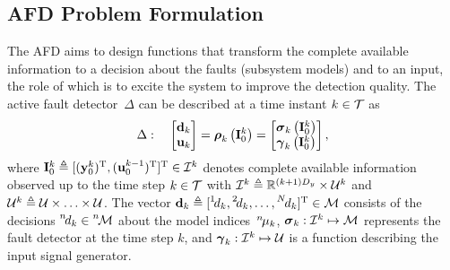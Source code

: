 \documentclass[conference,10pt]{IEEEtran}
\def\ist{\prescript{1\!}{}}
\def\iind{\prescript{2\!}{}}
\def\nth{\prescript{n\!}{}}
\def\Nth{\prescript{N\!}{}}
\begin{document}
\subsection{AFD Problem Formulation}\label{sec:AFD_problem_formulation}
The AFD aims to design functions that transform the complete available information to a decision about the faults (subsystem models) and to an input, the role of which is to excite the system to improve the detection quality. 
The active fault detector~$\Delta$ can be described at a time instant $k\in\mathcal{T}$ as
\begin{align}\label{ali:AFDsystem}
  \Delta:\quad
  \begin{bmatrix}
    \mathbf{d}_{k}\\ \mathbf{u}_{k}
  \end{bmatrix} = 
  \boldsymbol{\rho}_{k}\left(\mathbf{I}_{0}^{k}\right) =
  \begin{bmatrix}
    \boldsymbol{\sigma}_{k}\left( \mathbf{I}_0^k\right)\\ \boldsymbol{\gamma}_{k}\left(\mathbf{I}_{0}^{k}\right)
  \end{bmatrix},
\end{align}
where $\mathbf{I}_0^k\triangleq[(\mathbf{y}_{0}^{k})^{\text{T}},(\mathbf{u}_{0}^{k-1})^{\text{T}}]^{\text{T}}\in\mathcal{I}^k$ denotes complete available information observed up to the time step $k\in\mathcal{T}$ with $\mathcal{I}^{k}\triangleq\mathbb{R}^{(k+1)D_y}\times\mathcal{U}^{k}$ and $\mathcal{U}^{k}\triangleq\mathcal{U}\times\ldots\times\mathcal{U}$. 
The vector $\bfd_{k}\triangleq[\ist{d}_k,\iind{d}_k,\ldots,\Nth{d}_k]^{\T}\in\mcM$ consists of the  decisions $\nth{d}_k\in\nth{\mcM}$ about the model indices~$\nth{\mu}_k$, $\boldsymbol{\sigma}_{k}:\mathcal{I}^{k} \mapsto \mathcal{M}$ represents the fault detector at the time step $k$, and $\boldsymbol{\gamma}_{k}:\mathcal{I}^{k} \mapsto \mathcal{U}$ is a function describing the input signal generator. 
\end{document}

